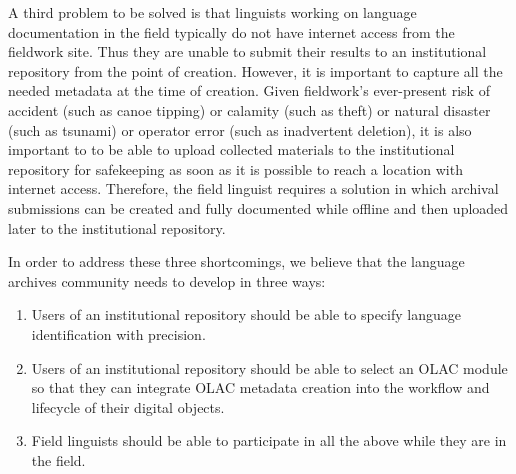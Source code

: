 A third problem to be solved is that linguists working
on language documentation in the field typically do not have internet access from
the fieldwork site. Thus they are unable to submit their
results to an institutional repository from the point of creation.
However, it is important to capture all the needed metadata at the time
of  creation.  Given fieldwork's ever-present risk of accident (such as
canoe tipping) or calamity (such as theft) or natural disaster (such
as tsunami) or operator error (such as inadvertent deletion), it is
also important to to be able to upload
collected materials to the institutional repository for safekeeping
as soon as it is possible to reach a location with internet access.
Therefore, the field linguist requires a solution in which archival
submissions can be created and fully documented while offline and then
uploaded later to the institutional repository.


In order to address these three shortcomings, we believe that the
language archives community needs to develop in three ways:

\renewcommand{\labelenumi}{T-3.\arabic{enumi}}
\begin{enumerate}\setlength{\itemsep}{0pt}
\item Users of an institutional repository should be able
  to specify language identification with precision.

\item Users of an institutional repository should be
    able to select an OLAC module so that they can integrate OLAC
    metadata creation into the workflow and lifecycle of their
    digital objects.

\item Field linguists should be able to participate in all the
    above while they are in the field.
\end{enumerate}


